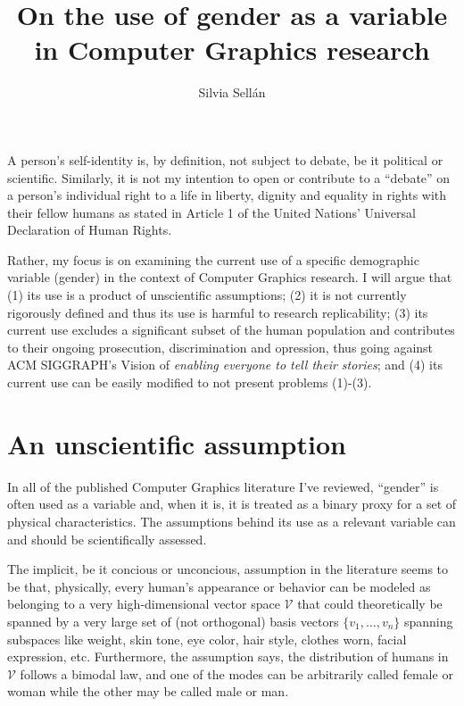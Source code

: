 \documentclass[acmtog,nonacm,review,balance=false]{acmart}
\begin{document}
\title{On the use of gender as a variable in Computer Graphics research}

\author{Silvia Sell\'{a}n}

\begin{abstract}
\end{abstract}


\maketitle


A person's self-identity is, by definition, not subject to debate, be it political or
scientific. Similarly, it is not my intention to open or contribute to a
``debate'' on a person's individual right to a life in liberty, dignity and equality in rights 
with their fellow
humans as stated in Article 1 of the United Nations' Universal Declaration
of Human Rights.  

Rather, my focus is on examining the current use of a specific demographic
variable (gender) in the context of Computer Graphics research. I will argue
that (1) its use is a product of unscientific assumptions; (2) it is not
currently rigorously
defined and thus its use is harmful to research replicability; (3) its current use excludes
a significant subset of the human population and contributes to their
ongoing prosecution, discrimination and opression, thus going against ACM
SIGGRAPH's Vision of \emph{enabling everyone to tell their stories}; and (4) its
current use can be easily modified to not present problems (1)-(3).

\section{An unscientific assumption}

In all of the published Computer Graphics literature I've reviewed, ``gender'' 
is often used as a variable and, when it is, it is treated as a binary proxy 
for a set of physical characteristics. The assumptions behind its use as a
relevant variable can and should be scientifically assessed.

The implicit, be it concious or unconcious, assumption in the literature seems
to be that, physically, every human's appearance or behavior can be modeled as
belonging to a very
high-dimensional vector space $\mathcal{V}$ that could theoretically be spanned
by a very large set of (not orthogonal) basis vectors $\{v_1,\dots, v_n\}$
spanning subspaces like weight,
skin tone, eye color, hair style, clothes worn, facial expression, etc.
Furthermore, the assumption says, the distribution of humans in $\mathcal{V}$
follows a bimodal law, and one of the modes can be arbitrarily called female or
woman
while the other may be called male or man. 
\end{document}
